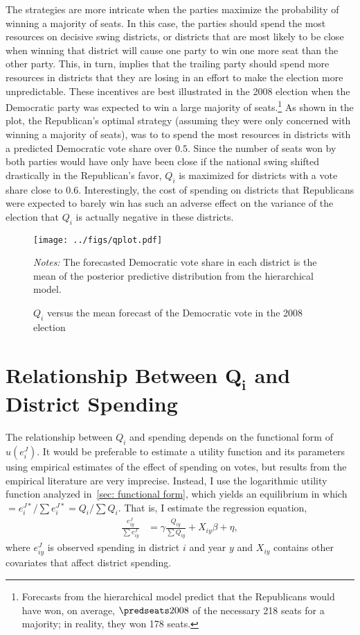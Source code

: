 \documentclass[12pt,final,fleqn]{article}
\theoremstyle{plain}
\begin{document}
The strategies are more intricate when the parties maximize the probability of winning a majority of seats. In this case, the parties should spend the most resources on decisive swing districts, or districts that are most likely to be close when winning that district will cause one party to win one more seat than the other party. This, in turn, implies that the trailing party should spend more resources in districts that they are losing in an effort to make the election more unpredictable. These incentives are best illustrated in the 2008 election when the Democratic party was expected to win a large majority of seats.\footnote{Forecasts from the hierarchical model predict that the Republicans would have won, on average, $\predseats2008$ of the necessary 218 seats for a majority; in reality, they won 178 seats.} As shown in the plot, the Republican's optimal strategy (assuming they were only concerned with winning a majority of seats), was to to spend the most resources in districts with a predicted Democratic vote share over $0.5$. Since the number of seats won by both parties would have only have been close if the national swing shifted drastically in the Republican's favor, $Q_i$ is maximized for districts with a vote share close to $0.6$. Interestingly, the cost of spending on districts that Republicans were expected to barely win has such an adverse effect on the variance of the election that $Q_i$ is actually negative in these districts.
 
\begin{figure}[!htb]
\texttt{[image: ../figs/qplot.pdf]}
\vspace{.5cm}
\caption{$Q_i$ versus the mean forecast of the Democratic vote in the 2008 election}
\label{fig: $Q_i$ versus the mean forecast of the Democratic vote in the 2008 election}
\begin{minipage}{\linewidth}
\footnotesize
\emph{Notes:} The forecasted Democratic vote share in each district is the mean of the posterior predictive distribution from the hierarchical model.
\end{minipage}
\end{figure}

\section{Relationship Between $\mathbf{Q_i}$ and District Spending}
The relationship between $Q_i$ and spending depends on the functional form of $u(e^J_i)$. It would be preferable to estimate a utility function and its parameters using empirical estimates of the effect of spending on votes, but results from the empirical literature are very imprecise. Instead, I use the logarithmic utility function analyzed in~\autoref{sec: functional form}, which yields an equilibrium in which $=e_i^{J*}/\sum e_i^{J*} =Q_i/\sum Q_i$. That is, I estimate the regression equation,
\begin{align} \label{eqn: regression eqn}
\frac{e_{iy}^{J}}{\sum e_{iy}^{J}} &= \gamma \frac{Q_{iy}}{\sum Q_{iy}} + X_{iy}\beta + \eta,
\end{align} 
where $e_{iy}^{J}$ is observed spending in district $i$ and year $y$ and $X_{iy}$ contains other covariates that affect district spending.
 
\end{document}
